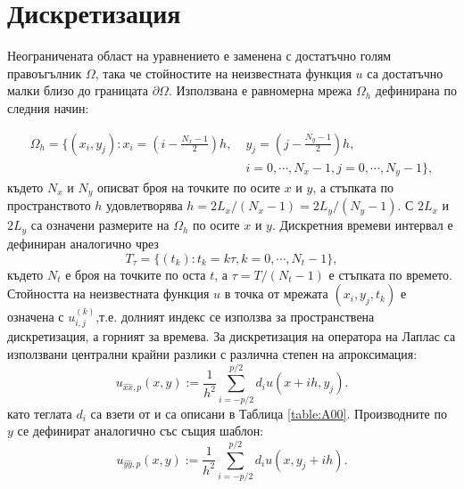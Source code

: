\documentclass{article}
\begin{document}
\section{Дискретизация}
Неограничената област на уравнението е заменена с достатъчно голям правоъгълник $\Omega$, така че стойностите на неизвестната функция $u$ са достатъчно малки близо до границата $\partial \Omega$. Използвана е равномерна мрежа  $\Omega_h$ дефинирана по следния начин:

\begin{align}\label{Omega}
\Omega_h = \{(x_i,y_j): x_i = (i-\frac{N_x-1}{2})h, \; &y_j = (j-\frac{N_y-1}{2})h, \nonumber\\
                                         & i = 0,\cdots, N_x-1, j = 0 ,\cdots , N_y-1 \},
\end{align}
където $N_x$ и $N_y$ описват броя на точките по осите $x$ и $y$, а стъпката по пространството $h$ удовлетворява $h =2 L_x/(N_x-1) =2 L_y/(N_y-1)$.
С $2 L_x$ и $2 L_y$ са означени размерите на $\Omega_h$ по осите $x$ и $y$. Дискретния времеви интервал е дефиниран аналогично чрез
$$
T_{\tau} = \{(t_k): t_k = k\tau, k = 0,\cdots ,N_t-1 \},
$$
където $N_t$ е броя на точките по оста $t$, а $\tau = T/(N_t-1)$ е стъпката по времето. Стойността на неизвестната функция $u$ в точка от мрежата $(x_i,y_j,t_k)$ е означена с $u_{i,j}^{(k)}$,т.е. долният индекс се използва за пространствена дискретизация, а горният за времева. За дискретизация на оператора на Лаплас са използвани централни крайни разлики с различна степен на апроксимация:
\begin{equation}\label{fdx}
u_{\widehat{xx},p}(x,y) :=  \frac{1}{h^2} \sum\limits_{i=-p/2}^{p/2} d_i u(x+ih, y_j).
\end{equation}
като теглата $d_i$ са взети от \cite{forn} и са описани в Таблица \ref{table:A00}. Производните по $y$ се дефинират аналогично със същия шаблон:
\begin{equation}\label{fdy}
u_{\widehat{yy},p}(x,y) :=  \frac{1}{h^2} \sum\limits_{i=-p/2}^{p/2} d_i u(x, y_j+ih).
\end{equation}
\end{document}
